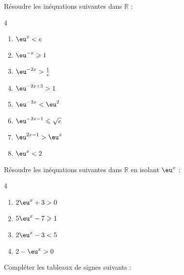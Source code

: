 \documentclass[main.tex]{subfiles}
\begin{document}
%
\newpage 
\begin{exercise}\label{chapter06:exercice:exp:inequation1s} 
Résoudre les inéquations suivantes dans $\mathbb{R}$ :
\begin{multicols}{4}
	\begin{enumerate}[label={$(I_{\arabic*})$}, leftmargin=*]
		\item $\eu^x<e$
		\item $\eu^{-x}\geqslant 1$
		\item $\eu^{-2x}>\tfrac{1}{e}$
		\item $\eu^{-2x+3}>1$
		\item $\eu^{-3x}<\eu^2$
		\item $\eu^{-2x-1}\leqslant \sqrt{e}$
		\item $\eu^{2x-1}>\eu^x$
		\item $\eu^x<2$
	\end{enumerate}
\end{multicols}  
\end{exercise}
\begin{exercise}\label{chapter06:exercice:exp:inequation2s} 
	Résoudre les inéquations suivantes dans $\mathbb{R}$ en isolant $\eu^x$ : 
	\begin{multicols}{4}
		\begin{enumerate}[label={$(I_{\arabic*})$}, leftmargin=*]
			\item $2\eu^x+3>0$
			\item $5\eu^{x}-7\geqslant 1$ 
			\item $2\eu^{x}-3<5$
			\item $2-\eu^{x}>0$
		\end{enumerate}
	\end{multicols}  
\end{exercise}   
\begin{exercise} Compléter les tableaux de signes suivants :\\ 
\noindent{}  
\hfill
{}  
\end{exercise}
\end{document}
